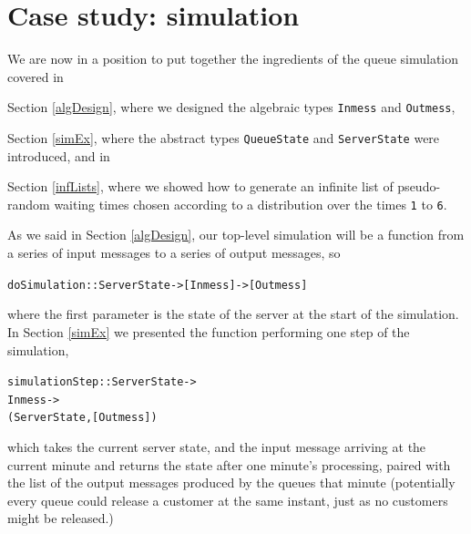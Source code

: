 \section{Case study: simulation}

We are now in a position to put together the ingredients of the queue
simulation covered in 
\begin{titemize}
\item Section \ref{algDesign}, where we designed the algebraic types
\texttt{Inmess} and \texttt{Outmess},
\item Section \ref{simEx}, where the abstract types \texttt{QueueState} and 
\texttt{ServerState} were introduced, and in 
\item Section \ref{infLists}, where we showed how to generate an infinite list
of pseudo-random waiting times chosen according to 
a distribution over the times \texttt{1} to \texttt{6}.
\end{titemize}
As we said in Section \ref{algDesign}, our top-level simulation will be a
function from a series of input messages to a series of output messages, so
\begin{alltt}
doSimulation :: ServerState -> [Inmess] -> [Outmess]
\end{alltt}
where the first parameter is the state of the server at the start of the
simulation. In Section \ref{simEx} we presented the function performing
one step of the simulation,
\begin{alltt}
simulationStep :: ServerState -> 
                  Inmess -> 
                  (ServerState, [Outmess])
\end{alltt}
which takes the current server state, and the input message arriving at the
current minute and returns the state after one minute's  processing, paired
with the list of the output messages produced by the queues that minute (potentially
every queue could release a customer at the same instant, just as no
customers might be released.)

